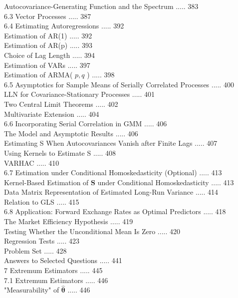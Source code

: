 \documentclass[10pt]{article}
\begin{document}
Autocovariance-Generating Function and the Spectrum ..... 383\\
6.3 Vector Processes ..... 387\\
6.4 Estimating Autoregressions ..... 392\\
Estimation of AR(1) ..... 392\\
Estimation of AR(p) ..... 393\\
Choice of Lag Length ..... 394\\
Estimation of VARs ..... 397\\
Estimation of ARMA( $p, q$ ) ..... 398\\
6.5 Asymptotics for Sample Means of Serially Correlated Processes ..... 400\\
LLN for Covariance-Stationary Processes ..... 401\\
Two Central Limit Theorems ..... 402\\
Multivariate Extension ..... 404\\
6.6 Incorporating Serial Correlation in GMM ..... 406\\
The Model and Asymptotic Results ..... 406\\
Estimating S When Autocovariances Vanish after Finite Lags ..... 407\\
Using Kernels to Estimate S ..... 408\\
VARHAC ..... 410\\
6.7 Estimation under Conditional Homoskedasticity (Optional) ..... 413\\
Kernel-Based Estimation of $\mathbf{S}$ under Conditional Homoskedasticity ..... 413\\
Data Matrix Representation of Estimated Long-Run Variance ..... 414\\
Relation to GLS ..... 415\\
6.8 Application: Forward Exchange Rates as Optimal Predictors ..... 418\\
The Market Efficiency Hypothesis ..... 419\\
Testing Whether the Unconditional Mean Is Zero ..... 420\\
Regression Tests ..... 423\\
Problem Set ..... 428\\
Answers to Selected Questions ..... 441\\
7 Extremum Estimators ..... 445\\
7.1 Extremum Estimators ..... 446\\
"Measurability" of $\hat{\boldsymbol{\theta}}$ ..... 446\\
\end{document}
